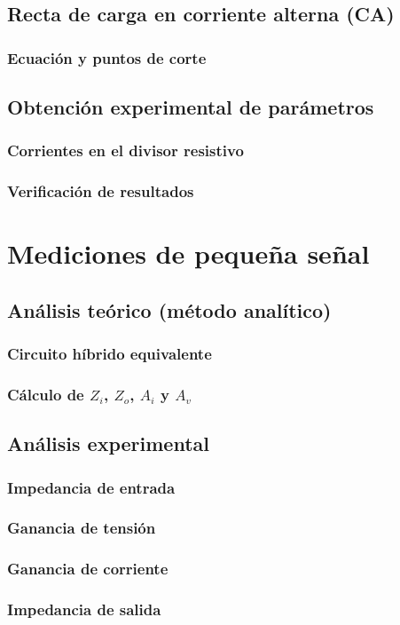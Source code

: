\documentclass[chaptersright]{informeutn}
\begin{document}
  \section{Recta de carga en corriente alterna (CA)}
    \subsection{Ecuación y puntos de corte}
  \section{Obtención experimental de parámetros}
    \subsection{Corrientes en el divisor resistivo}
    \subsection{Verificación de resultados}

\chapter{Mediciones de pequeña señal}
  \section{Análisis teórico (método analítico)}
    \subsection{Circuito híbrido equivalente}
    \subsection{Cálculo de $Z_i$, $Z_o$, $A_i$ y $A_v$}
  \section{Análisis experimental}
    \subsection{Impedancia de entrada}
    \subsection{Ganancia de tensión}
    \subsection{Ganancia de corriente}
    \subsection{Impedancia de salida}
\end{document}
